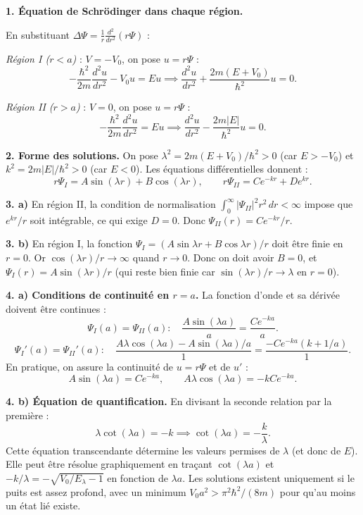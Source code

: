 \documentclass[12pt,a4paper]{article}
\begin{document}
\begin{boitecorrige}
\textbf{1. Équation de Schrödinger dans chaque région.}

En substituant $\Delta\Psi = \tfrac{1}{r}\tfrac{d^2}{dr^2}(r\Psi)$ :

\textit{Région I ($r < a$)} : $V = -V_0$, on pose $u = r\Psi$ :
\[
  -\frac{\hbar^2}{2m}\frac{d^2 u}{dr^2} - V_0 u = Eu
  \implies \frac{d^2 u}{dr^2} + \frac{2m(E+V_0)}{\hbar^2}u = 0.
\]

\textit{Région II ($r > a$)} : $V = 0$, on pose $u = r\Psi$ :
\[
  -\frac{\hbar^2}{2m}\frac{d^2 u}{dr^2} = Eu
  \implies \frac{d^2 u}{dr^2} - \frac{2m|E|}{\hbar^2}u = 0.
\]

\textbf{2. Forme des solutions.}
On pose $\lambda^2 = 2m(E+V_0)/\hbar^2 > 0$ (car $E > -V_0$) et $k^2 = 2m|E|/\hbar^2 > 0$
(car $E < 0$). Les équations différentielles donnent :
\[
  r\Psi_I = A\sin(\lambda r) + B\cos(\lambda r), \qquad
  r\Psi_{II} = Ce^{-kr} + De^{kr}.
\]

\textbf{3. a)} En région II, la condition de normalisation $\int_0^\infty|\Psi_{II}|^2 r^2\,dr < \infty$
impose que $e^{kr}/r$ soit intégrable, ce qui exige $D=0$. Donc $\Psi_{II}(r) = Ce^{-kr}/r$.

\textbf{3. b)} En région I, la fonction $\Psi_I = (A\sin\lambda r + B\cos\lambda r)/r$ doit être
finie en $r=0$. Or $\cos(\lambda r)/r \to \infty$ quand $r\to 0$. Donc on doit avoir $B=0$, et
$\Psi_I(r) = A\sin(\lambda r)/r$ (qui reste bien finie car $\sin(\lambda r)/r \to \lambda$ en
$r=0$).

\textbf{4. a) Conditions de continuité en $r=a$.}
La fonction d'onde et sa dérivée doivent être continues :
\[
  \Psi_I(a) = \Psi_{II}(a) : \quad \frac{A\sin(\lambda a)}{a} = \frac{Ce^{-ka}}{a}.
\]
\[
  \Psi_I'(a) = \Psi_{II}'(a) : \quad
  \frac{A\lambda\cos(\lambda a) - A\sin(\lambda a)/a}{1} = \frac{-Ce^{-ka}(k+1/a)}{1}.
\]
En pratique, on assure la continuité de $u = r\Psi$ et de $u'$ :
\[
  A\sin(\lambda a) = Ce^{-ka}, \qquad
  A\lambda\cos(\lambda a) = -kCe^{-ka}.
\]

\textbf{4. b) Équation de quantification.}
En divisant la seconde relation par la première :
\[
  \lambda\cot(\lambda a) = -k \implies \boxed{\cot(\lambda a) = -\frac{k}{\lambda}.}
\]
Cette équation transcendante détermine les valeurs permises de $\lambda$ (et donc de $E$). Elle
peut être résolue graphiquement en traçant $\cot(\lambda a)$ et $-k/\lambda = -\sqrt{V_0/E_\lambda
- 1}$ en fonction de $\lambda a$. Les solutions existent uniquement si le puits est assez profond,
avec un minimum $V_0 a^2 > \pi^2\hbar^2/(8m)$ pour qu'au moins un état lié existe.
\end{boitecorrige}
\end{document}
